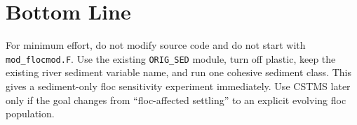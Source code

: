 \documentclass[11pt]{article}
\begin{document}
\section*{Bottom Line}

For minimum effort, do not modify source code and do not start with
\texttt{mod\_flocmod.F}.  Use the existing \texttt{ORIG\_SED} module, turn off
plastic, keep the existing river sediment variable name, and run one cohesive
sediment class.  This gives a sediment-only floc sensitivity experiment
immediately.  Use CSTMS later only if the goal changes from ``floc-affected
settling'' to an explicit evolving floc population.
\end{document}
